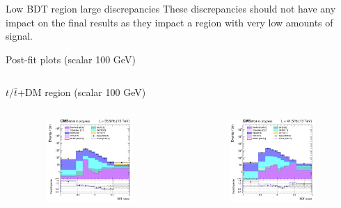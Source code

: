 \documentclass[8pt]{beamer}
\begin{document}
\begin{frame}{Low BDT region large discrepancies}
These discrepancies should not have any impact on the final results as they impact a region with very low amounts of signal. \vfill
\end{frame}








\begin{frame}{Post-fit plots (scalar 100 GeV)}
\begin{columns}
\begin{column}{1.09\textwidth}
\begin{block}{\centering $t/\bar t$+DM region (scalar 100 GeV)}\end{block} \vspace{10pt}
\end{column}
\end{columns} \vspace{-24pt}
\begin{columns}
		\begin{column}{0.33\textwidth}
			\begin{center}
			\begin{block}{}\end{block}	
     			\includegraphics[width=1.0\textwidth, height=90pt]{figs/postfits/2016/log_cratio_ST_topCR_ll_BDT_tDM100_TTbar_BDT_output_scalar100_customBinsAttempt7.png}
    		\end{center}		
		\end{column} 
		\begin{column}{0.33\textwidth}
			\begin{center}
			\begin{block}{}\end{block}	
     			\includegraphics[width=1.0\textwidth, height=90pt]{figs/postfits/2017/log_cratio_ST_topCR_ll_BDT_tDM100_TTbar_BDT_output_scalar100_customBinsAttempt7.png}

\end{center}
\end{column}
\end{columns}
\end{frame}
\end{document}

